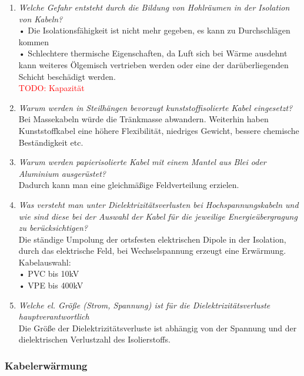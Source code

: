 \documentclass[12pt]{article}
\begin{document}
\begin{enumerate}
    \item \textit{Welche Gefahr entsteht durch die Bildung von 
    Hohlräumen in der Isolation von Kabeln?}\\
    • Die Isolationsfähigkeit ist nicht mehr gegeben, es kann zu Durchschlägen kommen \\
    • Schlechtere thermische Eigenschaften, da Luft sich bei 
    Wärme ausdehnt kann weiteres Ölgemisch vertrieben werden oder eine der darüberliegenden Schicht beschädigt werden.\\
    \textcolor{red}{TODO: Kapazität}
    \item \textit{Warum werden in Steilhängen bevorzugt 
    kunststoffisolierte Kabel eingesetzt?}\\
    Bei Massekabeln würde die Tränkmasse abwandern. Weiterhin haben Kunststoffkabel eine höhere Flexibilität, niedriges Gewicht, bessere chemische Beständigkeit etc.
    \item \textit{Warum werden papierisolierte Kabel mit einem 
    Mantel aus Blei oder Aluminium ausgerüstet?}\\
    Dadurch kann man eine gleichmäßige Feldverteilung erzielen.
    \item \textit{Was versteht man unter Dielektrizitätsverlusten bei 
    Hochspannungskabeln und wie sind diese bei der 
    Auswahl der Kabel für die jeweilige 
    Energieübergragung zu berücksichtigen? }\\
    Die ständige Umpolung der ortsfesten elektrischen Dipole in der Isolation, durch das elektrische Feld, 
    bei Wechselspannung erzeugt eine Erwärmung. \\
    Kabelauswahl: \\
    • PVC bis 10kV \\
    • VPE bis 400kV \\
    \item \textit{Welche el. Größe (Strom, Spannung) ist für die 
    Dielektrizitätsverluste hauptverantwortlich}\\
    Die Größe der Dielektrizitätsverluste ist abhängig von der Spannung und der dielektrischen 
    Verlustzahl des Isolierstoffs.
\end{enumerate}




\subsubsection{Kabelerwärmung}
\end{document}
